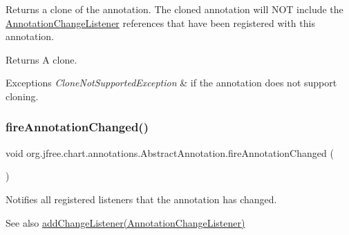 Returns a clone of the annotation. The cloned annotation will N\+OT include the \mbox{\hyperlink{}{Annotation\+Change\+Listener}} references that have been registered with this annotation.

\begin{DoxyReturn}{Returns}
A clone.
\end{DoxyReturn}

\begin{DoxyExceptions}{Exceptions}
{\em Clone\+Not\+Supported\+Exception} & if the annotation does not support cloning. \\
\hline
\end{DoxyExceptions}
\mbox{\label{classorg_1_1jfree_1_1chart_1_1annotations_1_1_abstract_annotation_a41abf9fcfb7a461f9095912b1e532b90}} 
\subsubsection{\texorpdfstring{fire\+Annotation\+Changed()}{fireAnnotationChanged()}}
{\footnotesize\ttfamily void org.\+jfree.\+chart.\+annotations.\+Abstract\+Annotation.\+fire\+Annotation\+Changed (\begin{DoxyParamCaption}{ }\end{DoxyParamCaption})\hspace{0.3cm}{\ttfamily [protected]}}

Notifies all registered listeners that the annotation has changed.

\begin{DoxySeeAlso}{See also}
\mbox{\hyperlink{classorg_1_1jfree_1_1chart_1_1annotations_1_1_abstract_annotation_a142d8df764f22560ce23ae44bdc9f4a6}{add\+Change\+Listener(\+Annotation\+Change\+Listener)}} 
\end{DoxySeeAlso}
\mbox{\label{classorg_1_1jfree_1_1chart_1_1annotations_1_1_abstract_annotation_a2c22d59758526f591477be87806b537e}} 
